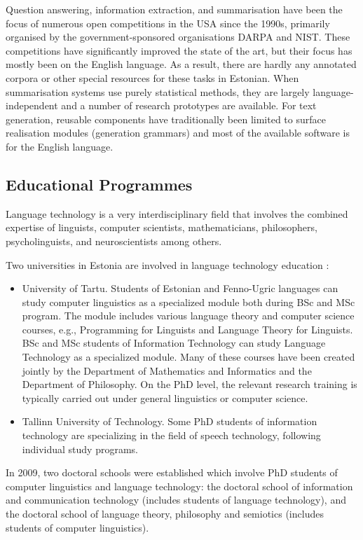 \documentclass[]{../metanetpaper}
\begin{document}
\begin{multicols}{2}
Question answering, information extraction, and summarisation have been the focus of numerous open competitions in the USA since the 1990s, primarily organised by the government-sponsored organisations DARPA and NIST. These competitions have significantly improved the state of the art, but their focus has mostly been on the English language. As a result, there are hardly any annotated corpora or other special resources for these tasks in Estonian. When summarisation systems use purely statistical methods, they are largely language-independent and a number of research prototypes are available. For text generation, reusable components have traditionally been limited to surface realisation modules (generation grammars) and most of the available software is for the English language. 

\subsection{Educational Programmes}

Language technology is a very interdisciplinary field that involves the combined expertise of linguists, computer scientists, mathematicians, philosophers, psycholinguists, and neuroscientists among others. 

Two universities in Estonia are involved in language technology education \cite{Meisteretal}: 
\begin{itemize}
 \item University of Tartu. Students of Estonian and Fenno-Ugric languages can study computer linguistics as a specialized module both during BSc and MSc program. The module includes various language theory and computer science courses, e.g., Programming for Linguists and Language Theory for Linguists. BSc and MSc students of Information Technology can study Language Technology as a specialized module. Many of these courses have been created jointly by the Department of Mathematics and Informatics and the Department of Philosophy. On the PhD level, the relevant research training is typically carried out under general linguistics or computer science.
\item  Tallinn University of Technology. Some PhD students of information technology are specializing in the field of speech technology, following individual study programs.
\end{itemize}

In 2009, two doctoral schools were established which involve PhD students of computer linguistics and language technology: the doctoral school of information and communication technology (includes students of language technology), and the doctoral school of language theory, philosophy and semiotics (includes students of computer linguistics).



\end{multicols}
\end{document}
